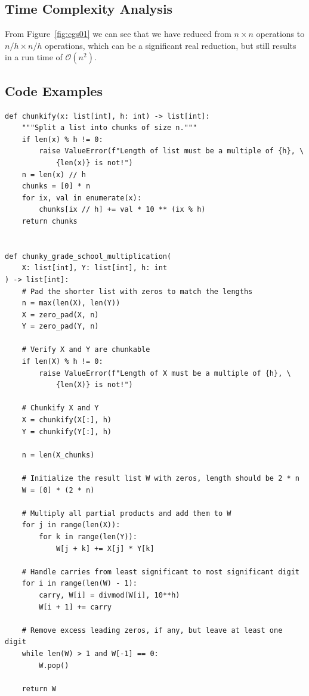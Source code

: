 \documentclass[psamsfonts,reqno]{amsart}
\theoremstyle{definition}
\theoremstyle{remark}
\numberwithin{equation}{section}
\begin{document}
\subsection{Time Complexity Analysis \nopunct}

From Figure~\ref{fig:cgs01} we can see that we have reduced from $n \times n$ operations to $n/h \times n/h$ operations, which can be a significant real reduction, but still results in a run time of $\mathcal{O}(n^2)$.

\subsection{Code Examples \nopunct}

\begin{verbatim}
def chunkify(x: list[int], h: int) -> list[int]:
    """Split a list into chunks of size n."""
    if len(x) % h != 0:
        raise ValueError(f"Length of list must be a multiple of {h}, \
        	{len(x)} is not!")
    n = len(x) // h
    chunks = [0] * n
    for ix, val in enumerate(x):
        chunks[ix // h] += val * 10 ** (ix % h)
    return chunks


def chunky_grade_school_multiplication(
	X: list[int], Y: list[int], h: int
) -> list[int]:
    # Pad the shorter list with zeros to match the lengths
    n = max(len(X), len(Y))
    X = zero_pad(X, n)
    Y = zero_pad(Y, n)

    # Verify X and Y are chunkable
    if len(X) % h != 0:
        raise ValueError(f"Length of X must be a multiple of {h}, \
        	{len(X)} is not!")

    # Chunkify X and Y
    X = chunkify(X[:], h)
    Y = chunkify(Y[:], h)

    n = len(X_chunks)

    # Initialize the result list W with zeros, length should be 2 * n
    W = [0] * (2 * n)

    # Multiply all partial products and add them to W
    for j in range(len(X)):
        for k in range(len(Y)):
            W[j + k] += X[j] * Y[k]

    # Handle carries from least significant to most significant digit
    for i in range(len(W) - 1):
        carry, W[i] = divmod(W[i], 10**h)
        W[i + 1] += carry

    # Remove excess leading zeros, if any, but leave at least one digit
    while len(W) > 1 and W[-1] == 0:
        W.pop()

    return W
\end{verbatim}
\end{document}

